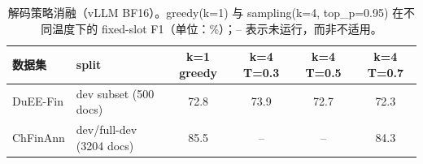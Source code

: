 \begin{table}[htbp]
\centering
\caption{解码策略消融（vLLM BF16）。greedy(k=1) 与 sampling(k=4, top\_p=0.95) 在不同温度下的 fixed-slot F1（单位：\%）；-- 表示未运行，而非不适用。}
\label{tab:decoding}
\small
\begin{tabular}{llSSSS}
\toprule
数据集 & split & {k=1 greedy} & {k=4 T=0.3} & {k=4 T=0.5} & {k=4 T=0.7} \\
\midrule
DuEE-Fin & dev subset (500 docs) & 72.8 & 73.9 & 72.7 & 72.3 \\
ChFinAnn & dev/full-dev (3204 docs) & 85.5 &  &  & 84.3 \\
\bottomrule
\end{tabular}
\end{table}
